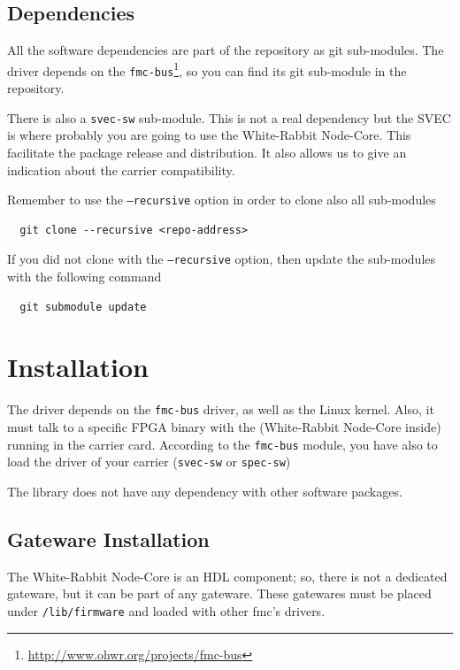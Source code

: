 \documentclass[a4paper,10pt]{article}
\begin{document}
\subsection{Dependencies}%
All the software dependencies are part of the repository as git
sub-modules. The driver depends on the
\texttt{fmc-bus}\footnote{\url{http://www.ohwr.org/projects/fmc-bus}},
so you can find its git sub-module in the repository.

There is also a \texttt{svec-sw} sub-module. This is not a real
dependency but the SVEC is where probably you are going to use the
White-Rabbit Node-Core. This facilitate the package release and
distribution. It also allows us to give an indication about the
carrier compatibility.

Remember to use the \texttt{--recursive} option in order to clone also
all sub-modules

\begin{verbatim}
  git clone --recursive <repo-address>
\end{verbatim}

If you did not clone with the \texttt{--recursive} option, then update
the sub-modules with the following command

\begin{verbatim}
  git submodule update
\end{verbatim}


\section{Installation}%
The driver depends on the \texttt{fmc-bus} driver, as well as the
Linux kernel. Also, it must talk to a specific FPGA binary with the
(White-Rabbit Node-Core inside) running in the carrier card. According
to the \texttt{fmc-bus} module, you have also to load the driver of
your carrier (\texttt{svec-sw} or \texttt{spec-sw})

The library does not have any dependency with other software packages.

\subsection{Gateware Installation}%
The White-Rabbit Node-Core is an HDL component; so, there is not
a dedicated gateware, but it can be part of any gateware. These
gatewares must be placed under \texttt{/lib/firmware} and loaded with
other fmc's drivers.
\end{document}
